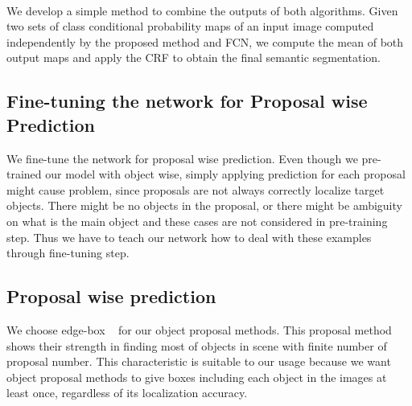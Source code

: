 \documentclass[10pt,twocolumn,letterpaper]{article}
\begin{document}
\ifdefined{} \\ \fi
We develop a simple method to combine the outputs of both algorithms.
Given two sets of class conditional probability maps of an input image computed independently by the proposed method and FCN, we compute the mean of both output maps and apply the CRF to obtain the final semantic segmentation.





\iffalse
\subsection{Fine-tuning the network for Proposal wise Prediction}
We fine-tune the network for proposal wise prediction. 
Even though we pre-trained our model with object wise, simply applying prediction for each proposal might cause problem, since proposals are not always correctly localize target objects. There might be no objects in the proposal, or there might be ambiguity on what is the main object and these cases are not considered in pre-training step. 
Thus we have to teach our network how to deal with these examples through fine-tuning step.

\iffalse
We use images cropped by object proposal box as training examples. 
For every images in training set, we generate object proposal and crop the image and corresponding segmentation ground truth. 
We apply box expansion process in the same way as which we applied in pre-training step. 
This is for the case when object proposal correctly locate the object. 
In that case it makes sense that we have to expend this box with same procedure we used in pre-training step.

We utilize PASCAL VOC2012 for fine-tuning. 
As in pre-training, we augmented the traning data with annotation given by ~\cite{Hariharan} and augmented training set contains 10582 images. 
We compare the score before and after the fine-tuning in VOC2012 validation, and it is revealed that fine-tuning enhance the score in a large amount. 
The result is shown in Table 1. 
\fi

\subsection{Proposal wise prediction}
\iffalse
We choose edge-box ~\cite{Edgebox} for our object proposal methods. 
This proposal method shows their strength in finding most of objects in scene with finite number of proposal number. 
This characteristic is suitable to our usage because we want object proposal methods to give boxes including each object in the images at least once, regardless of its localization accuracy.
\end{document}
